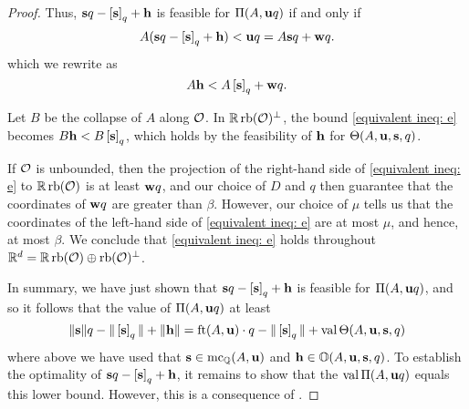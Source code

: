 \documentclass[11pt]{amsart}
\renewcommand{\!}[1]{{\color{red}\text{$\star$\,}#1\,$\star$}}
\begin{document}
\begin{proof}
Thus, $\mathbf{s}q - \left[ \mathbf{s} \right]_q + \mathbf{h}$ is feasible for $\Pi(A, \mathbf{u}q)$ if and only if
\[ A (\mathbf{s}q - \left[ \mathbf{s} \right]_q + \mathbf{h})  < \mathbf{u}q = A {\mathbf{s}}q + \mathbf{w}q.\] 
which we rewrite as 
\begin{equation} 
\label{equivalent ineq: e}
A \mathbf{h} < A \left[ \mathbf{s} \right]_q + \mathbf{w}q.
\end{equation}

Let $B$ be the collapse of $A$ along $\mathcal{O}$.  In $\mathbb{R} \operatorname{rb}(\mathcal{O})^{\perp}$, the bound \eqref{equivalent ineq: e} becomes $B \mathbf{h} < B \left[ \mathbf{s} \right]_q$, which holds by the feasibility of $\mathbf{h}$ for $\Theta(A, \mathbf{u}, \mathbf{s}, q)$.  

If $\mathcal{O}$ is unbounded, then the projection of the right-hand side of \eqref{equivalent ineq: e} to $\mathbb{R} \operatorname{rb}(\mathcal{O})$ is at least $\mathbf{w}q$, and our choice of $D$ and $q$ then guarantee that the coordinates of $\mathbf{w}q$ are greater than $\beta$.  However,  our choice of $\mu$ tells us that the coordinates of the left-hand side of \eqref{equivalent ineq: e} are at most $\mu$, and hence, at most $\beta$.  We conclude that \eqref{equivalent ineq: e} holds throughout $\mathbb{R}^d = \mathbb{R} \operatorname{rb}(\mathcal{O}) \oplus \operatorname{rb}(\mathcal{O})^{\perp}$.

In summary, we have just shown that $\mathbf{s}q-\left[ \mathbf{s} \right]_q + \mathbf{h}$ is feasible for $\Pi(A, \mathbf{u}q)$, and so it follows that the value of $\Pi(A, \mathbf{u}q)$ at least 
\[  \| \mathbf{s} \|q - \| \left[ \mathbf{s} \right]_q \| + \| \mathbf{h} \| = \operatorname{ft}(A, \mathbf{u}) \cdot q - \| \left[ \mathbf{s} \right]_q \| + \operatorname{val} \Theta(A, \mathbf{u}, \mathbf{s}, q) \] 
where above we have used that $\mathbf{s} \in \operatorname{mc}_{\mathbb{Q}}(A, \mathbf{u})$ and $\mathbf{h} \in \mathbb{O}(A, \mathbf{u}, \mathbf{s}, q)$.  To establish the optimality of $\mathbf{s}q - \left[ \mathbf{s} \right]_q + \mathbf{h}$, it remains to show that the $\operatorname{val} \Pi(A, \mathbf{u}q)$ equals this lower bound.  However, this is a consequence of .
\end{proof}
\end{document}
